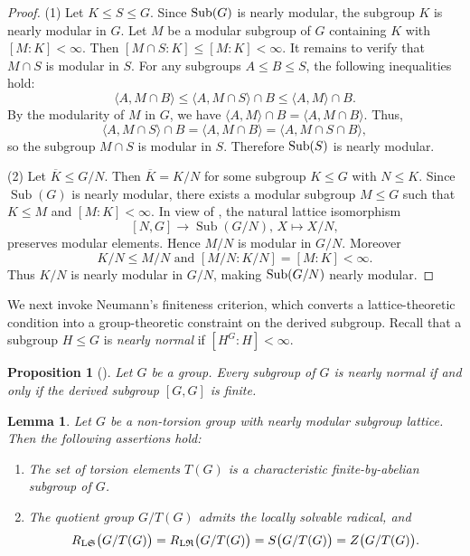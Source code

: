 \documentclass[11pt, reqno]{amsart}
\numberwithin{equation}{section}
\newtheorem{lemma}[theorem]{Lemma}
\newtheorem{proposition}[theorem]{Proposition}
\theoremstyle{definition}
\numberwithin{equation}{section}
\begin{document}
\begin{proof}
(1) Let $K \leq S \leq G$. Since $\textup{Sub}(G)$ is nearly modular, the subgroup $K$ is nearly modular in $G$. Let $M$ be a modular subgroup of $G$ containing $K$ with $[M:K] < \infty$. Then $[M \cap S:K] \leq [M:K] < \infty.$ It remains to verify that $M \cap S$ is modular in $S$. For any subgroups $A \leq B \leq S$, the following inequalities hold: $$\langle A, M \cap B \rangle \leq \langle A, M \cap S \rangle \cap B \leq \langle A, M \rangle \cap B.$$ By the modularity of $M$ in $G$,  we have $\langle A, M \rangle \cap B = \langle A, M \cap B \rangle.$ Thus, $$\langle A, M \cap S \rangle \cap B  = \langle A, M \cap B \rangle = \langle A, M \cap S \cap B \rangle,$$ so the subgroup $M \cap S$ is modular in $S$. Therefore $\textup{Sub}(S)$ is nearly modular.

\medskip

(2)  Let $\overline K\leq G/N$. Then
$\overline K=K/N$ for some subgroup $K\leq G$ with $N\leq K$.
Since $\operatorname{Sub}(G)$ is nearly modular, there exists a modular subgroup
$M\leq G$ such that $K\leq M$ and $[M:K]<\infty.$
In view of \cite[Proposition 7.1.5]{Humphreys}, the natural
lattice isomorphism
    $$[N,G]\rightarrow \operatorname{Sub}(G/N), \, X\mapsto X/N,$$ preserves modular elements. 
    Hence $M/N$ is modular in $G/N$. Moreover 
    $$K/N\leq M/N \text{ and } [M/N:K/N]=[M:K]<\infty.$$
Thus $K/N$ is nearly modular in $G/N$, making $\textup{Sub}(G/N)$ nearly modular.
\end{proof}

We next invoke Neumann's finiteness criterion, which converts a lattice-theoretic condition into a group-theoretic constraint on the derived subgroup. Recall that a subgroup $H \leq G$ is \emph{nearly normal} if $[H^G:H] < \infty$.

\begin{proposition}[{\cite[Theorem 13.1]{Neumann_groupswithfiniteclass}}]\label{theo:everysubgroupisnearlynormal}
    Let $G$ be a group. Every subgroup of $G$ is nearly normal if and only if the derived subgroup $[G,G]$ is finite. 
\end{proposition}

\begin{lemma}\label{lem:nonpernearmodularlatfinabel}
Let $G$ be a non-torsion group with nearly modular subgroup lattice. Then the following assertions hold:
\begin{enumerate}[label = \textup{(\arabic*)}]
    \item The set of torsion elements $T(G)$ is a characteristic finite-by-abelian subgroup of $G$.
    \item The quotient group $G/T(G)$ admits the locally solvable radical, and 
    $$ R_{\textup{L}\mathfrak{S}}\bigl(G/T(G)\bigr) = R_{\textup{L}\mathfrak{R}}\bigl(G/T(G)\bigr) = S\bigl(G/T(G)\bigr) = Z\bigl(G/T(G)\bigr). $$
\end{enumerate}
\end{lemma}
\end{document}

